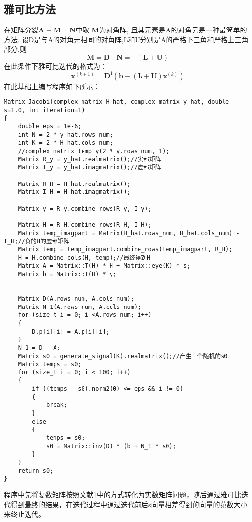\documentclass[twocolumn]{ctexart}
\begin{document}
\subsection{雅可比方法}
\par 在矩阵分裂$\boldsymbol{A}=\boldsymbol{M}-\boldsymbol{N}  $中取  $\boldsymbol{M}$为对角阵, 且其元素是$  \boldsymbol{A}  $的对角元是一种最简单的方法. 设D是与A的对角元相同的对角阵,L和U分别是A的严格下三角和严格上三角部分,则
\[\boldsymbol{M}=\boldsymbol{D}  \quad \boldsymbol{N}=-(\boldsymbol{L}+\boldsymbol{U})\]
在此条件下雅可比迭代的格式为：
\[\boldsymbol{x}^{(k+1)}=\boldsymbol{D}^{1}\left(\boldsymbol{b}-(\boldsymbol{L}+\boldsymbol{U}) \boldsymbol{x}^{(k)}\right)\]
在此基础上编写程序如下所示：
\begin{lstlisting}
Matrix Jacobi(complex_matrix H_hat, complex_matrix y_hat, double s=1.0, int iteration=1)
{
	double eps = 1e-6;
	int N = 2 * y_hat.rows_num;
	int K = 2 * H_hat.cols_num;
	//complex_matrix temp_y(2 * y.rows_num, 1);
	Matrix R_y = y_hat.realmatrix();//实部矩阵
	Matrix I_y = y_hat.imagmatrix();//虚部矩阵

	Matrix R_H = H_hat.realmatrix();
	Matrix I_H = H_hat.imagmatrix();

	Matrix y = R_y.combine_rows(R_y, I_y);

	Matrix H = R_H.combine_rows(R_H, I_H);
	Matrix temp_imagpart = Matrix(H_hat.rows_num, H_hat.cols_num) - I_H;//负的H的虚部矩阵
	Matrix temp = temp_imagpart.combine_rows(temp_imagpart, R_H);
	H = H.combine_cols(H, temp);//最终得到H
	Matrix A = Matrix::T(H) * H + Matrix::eye(K) * s;
	Matrix b = Matrix::T(H) * y;


	Matrix D(A.rows_num, A.cols_num);
	Matrix N_1(A.rows_num, A.cols_num); 
	for (size_t i = 0; i <A.rows_num; i++)
	{
		D.p[i][i] = A.p[i][i];
	}
	N_1 = D - A;
	Matrix s0 = generate_signal(K).realmatrix();//产生一个随机的s0
	Matrix temps = s0;
	for (size_t i = 0; i < 100; i++)
	{
		if ((temps - s0).norm2(0) <= eps && i != 0)
		{
			break;
		}
		else
		{
			temps = s0;
			s0 = Matrix::inv(D) * (b + N_1 * s0);
		}
	}
	return s0;
}
\end{lstlisting}
\par 程序中先将复数矩阵按照文献1中的方式转化为实数矩阵问题，随后通过雅可比迭代得到最终的结果，在迭代过程中通过迭代前后s向量相差得到的向量的范数大小来终止迭代。
\end{document}
